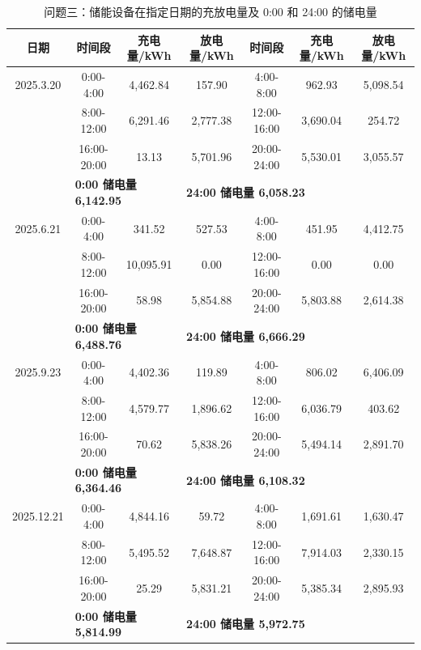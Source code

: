 \documentclass[withoutpreface]{cumcmthesis}
\newcommand{\hd}[1]{\textbf{#1}}
\begin{document}
\begin{table}[!htbp]
  \centering
  \caption{问题三：储能设备在指定日期的充放电量及 0:00 和 24:00 的储电量}
  \label{tab:q3t2}
  \begin{tabular}{c c c c c c c}
    \toprule[1.5pt]
    \hd{日期} & \hd{时间段} & \hd{充电量/kWh} & \hd{放电量/kWh} & \hd{时间段} & \hd{充电量/kWh} & \hd{放电量/kWh}\\
    \midrule[1pt]
2025.3.20 & 0:00-4:00 & 4,462.84  &  157.90 & 4:00-8:00 & 962.93  &  5,098.54\\
 & 8:00-12:00 & 6,291.46  &  2,777.38 & 12:00-16:00 & 3,690.04  &  254.72\\
 & 16:00-20:00 & 13.13  &  5,701.96 & 20:00-24:00 & 5,530.01  &  3,055.57\\
 & \multicolumn{2}{l}{\hd{0:00 储电量 6,142.95}} & \multicolumn{3}{l}{\hd{24:00 储电量 6,058.23}}\\
\midrule[1pt]
2025.6.21 & 0:00-4:00 & 341.52  &  527.53 & 4:00-8:00 & 451.95  &  4,412.75\\
 & 8:00-12:00 & 10,095.91  &  0.00 & 12:00-16:00 & 0.00  &  0.00\\
 & 16:00-20:00 & 58.98  &  5,854.88 & 20:00-24:00 & 5,803.88  &  2,614.38\\
 & \multicolumn{2}{l}{\hd{0:00 储电量 6,488.76}} & \multicolumn{3}{l}{\hd{24:00 储电量 6,666.29}}\\
\midrule[1pt]
2025.9.23 & 0:00-4:00 & 4,402.36  &  119.89 & 4:00-8:00 & 806.02  &  6,406.09\\
 & 8:00-12:00 & 4,579.77  &  1,896.62 & 12:00-16:00 & 6,036.79  &  403.62\\
 & 16:00-20:00 & 70.62  &  5,838.26 & 20:00-24:00 & 5,494.14  &  2,891.70\\
 & \multicolumn{2}{l}{\hd{0:00 储电量 6,364.46}} & \multicolumn{3}{l}{\hd{24:00 储电量 6,108.32}}\\
\midrule[1pt]
2025.12.21 & 0:00-4:00 & 4,844.16  &  59.72 & 4:00-8:00 & 1,691.61  &  1,630.47\\
 & 8:00-12:00 & 5,495.52  &  7,648.87 & 12:00-16:00 & 7,914.03  &  2,330.15\\
 & 16:00-20:00 & 25.29  &  5,831.21 & 20:00-24:00 & 5,385.34  &  2,895.93\\
 & \multicolumn{2}{l}{\hd{0:00 储电量 5,814.99}} & \multicolumn{3}{l}{\hd{24:00 储电量 5,972.75}}\\
    \bottomrule[1.5pt]
  \end{tabular}
\end{table}
\end{document}
